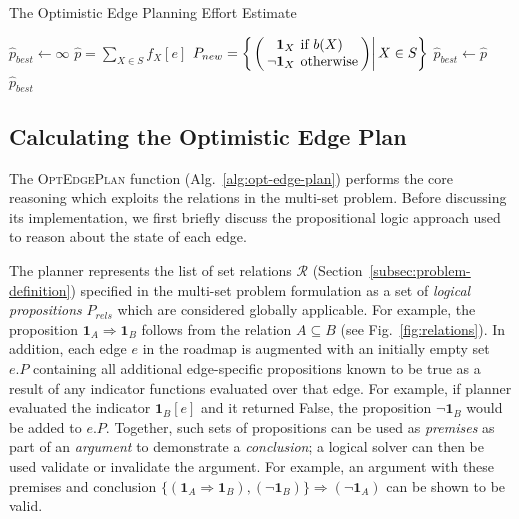 \begin{algorithm}
\caption{The Optimistic Edge Planning Effort Estimate}
\label{alg:opt-edge-plan}
\begin{algorithmic}[1]
   \State ${\hat p}_{best} \leftarrow \infty$
         \label{line:power-set}
      \State ${\hat p} = \sum_{X \in S} f_X[e]$
            \label{line:all-binary-functions}
         \State $\arraycolsep=2pt
            P_{new} =
            \left\{\left.\left( \begin{array}{rl}
            \mathbf{1}_X & \mbox{if } b(X) \\
            \lnot \mathbf{1}_X & \mbox{otherwise} \\
            \end{array} \right)
            \right|
            X \in S
            \right\}$
               \State ${\hat p}_{best} \leftarrow {\hat p}$
            \EndIf
         \EndIf
      \EndFor
   \EndFor
   \State \Return ${\hat p}_{best}$
\EndFunction
\end{algorithmic}
\end{algorithm}

\subsection{Calculating the Optimistic Edge Plan}
\label{subsec:alg-opt-edge-plan}

The \textsc{OptEdgePlan} function (Alg.~\ref{alg:opt-edge-plan})
performs the core reasoning which exploits the relations in
the multi-set problem.
Before discussing its implementation,
we first briefly discuss the propositional logic approach
used to reason about the state of each edge.

The planner represents the list of set relations $\mathcal{R}$
(Section~\ref{subsec:problem-definition})
specified in the multi-set problem formulation
as a set of \emph{logical propositions} $P_{rels}$
which are considered globally applicable.
For example,
the proposition $\mathbf{1}_A \Rightarrow \mathbf{1}_B$
follows from the relation $A \subseteq B$
(see Fig.~\ref{fig:relations}).
In addition,
each edge $e$ in the roadmap is augmented with an initially empty
set $e.P$ containing all additional edge-specific propositions
known to be true as a result of any indicator functions evaluated
over that edge.
For example,
if planner evaluated the indicator $\mathbf{1}_B[e]$
and it returned False,
the proposition $\lnot\mathbf{1}_B$ would be added to $e.P$.
Together, such sets of propositions can be used as \emph{premises}
as part of an \emph{argument} to demonstrate a \emph{conclusion};
a logical solver can then be used validate or invalidate the argument.
For example, an argument with these premises and conclusion
$\{ (\mathbf{1}_A \Rightarrow \mathbf{1}_B), (\lnot\mathbf{1}_B) \}
\Rightarrow (\lnot\mathbf{1}_A)$
can be shown to be valid.

